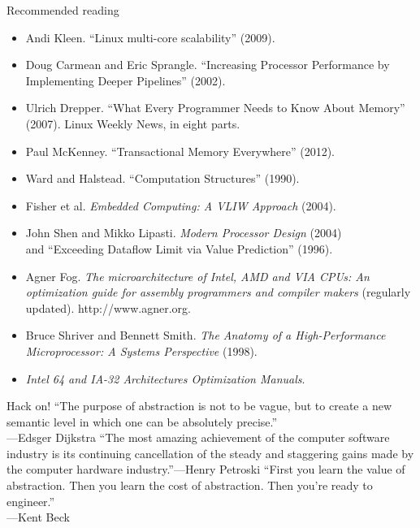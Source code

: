 \documentclass[mathserif,xcolor={dvipsnames,table}]{beamer}
\begin{document}
\begin{frame}{Recommended reading}
\footnotesize{
\begin{itemize}
\item Andi Kleen. ``Linux multi-core scalability'' (2009).
\item Doug Carmean and Eric Sprangle. ``Increasing Processor Performance by Implementing Deeper Pipelines'' (2002).
\item Ulrich Drepper. ``What Every Programmer Needs to Know About Memory'' (2007). Linux Weekly News, in eight parts.
\item Paul McKenney. ``Transactional Memory Everywhere'' (2012).
\item Ward and Halstead. ``Computation Structures'' (1990).
\item Fisher et al. \textit{Embedded Computing: A VLIW Approach} (2004).
\item John Shen and Mikko Lipasti. \textit{Modern Processor Design} (2004)\\
and ``Exceeding Dataflow Limit via Value Prediction'' (1996).
\item Agner Fog. \textit{The microarchitecture of Intel, AMD and VIA CPUs: An optimization guide for assembly programmers and compiler makers} (regularly updated). http://www.agner.org.
\item Bruce Shriver and Bennett Smith. \textit{The Anatomy of a High-Performance Microprocessor: A Systems Perspective} (1998).
\item \textit{Intel 64 and IA-32 Architectures Optimization Manuals}.
\end{itemize}
}
\end{frame}

\begin{frame}{Hack on!}
``The purpose of abstraction is not to be vague, but to create a new semantic level in which one can be absolutely precise.''\\
\hfill---Edsger Dijkstra
\vfill
``The most amazing achievement of the computer software industry is its 
continuing cancellation of the steady and staggering gains made by the 
computer hardware industry.''\hfill---Henry Petroski
\vfill
\vfill
``First you learn the value of abstraction. Then you learn the cost of abstraction. Then you're ready to engineer.''\\
\hfill---Kent Beck
\end{frame}
\end{document}

